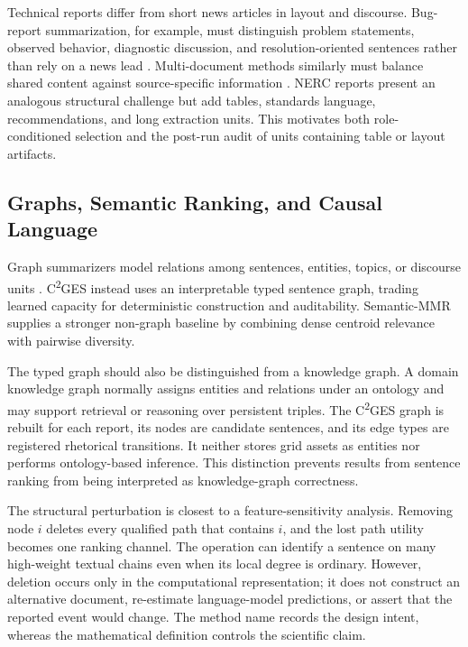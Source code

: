 \documentclass[applsci,article,submit,moreauthors]{Definitions/mdpi}
\newcommand{\cges}{C\textsuperscript{2}GES}
\begin{document}
Technical reports differ from short news articles in layout and discourse. Bug-report summarization, for example, must distinguish problem statements, observed behavior, diagnostic discussion, and resolution-oriented sentences rather than rely on a news lead \cite{koh2022bugreport}. Multi-document methods similarly must balance shared content against source-specific information \cite{zhang2024tomds}. NERC reports present an analogous structural challenge but add tables, standards language, recommendations, and long extraction units. This motivates both role-conditioned selection and the post-run audit of units containing table or layout artifacts.

\subsection{Graphs, Semantic Ranking, and Causal Language}

Graph summarizers model relations among sentences, entities, topics, or discourse units \cite{wang2020heterogeneous,cui2020enhancing,jing2021multiplex}. \cges{} instead uses an interpretable typed sentence graph, trading learned capacity for deterministic construction and auditability. Semantic-MMR supplies a stronger non-graph baseline by combining dense centroid relevance with pairwise diversity.

The typed graph should also be distinguished from a knowledge graph. A domain knowledge graph normally assigns entities and relations under an ontology and may support retrieval or reasoning over persistent triples. The \cges{} graph is rebuilt for each report, its nodes are candidate sentences, and its edge types are registered rhetorical transitions. It neither stores grid assets as entities nor performs ontology-based inference. This distinction prevents results from sentence ranking from being interpreted as knowledge-graph correctness.

The structural perturbation is closest to a feature-sensitivity analysis. Removing node $i$ deletes every qualified path that contains $i$, and the lost path utility becomes one ranking channel. The operation can identify a sentence on many high-weight textual chains even when its local degree is ordinary. However, deletion occurs only in the computational representation; it does not construct an alternative document, re-estimate language-model predictions, or assert that the reported event would change. The method name records the design intent, whereas the mathematical definition controls the scientific claim.
\end{document}
